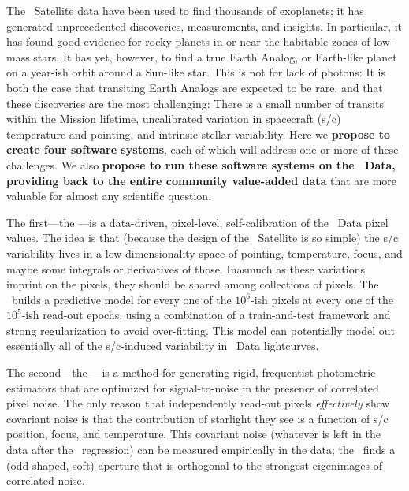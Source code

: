 \documentclass[letterpaper,12pt]{article}
\begin{document}
The \Kepler\ Satellite data have been used to find thousands of exoplanets;
it has generated unprecedented discoveries, measurements, and insights.
In particular, it has found good evidence for rocky planets in or near the
habitable zones of low-mass stars.
It has yet, however, to find a true Earth Analog, or Earth-like planet on a
year-ish orbit around a Sun-like star.
This is not for lack of photons:
It is both the case that transiting Earth Analogs are expected to be rare, and
that these discoveries are the most challenging:
There is a small number of transits within the Mission lifetime,
uncalibrated variation in spacecraft (s/c) temperature and pointing,
and intrinsic stellar variability.
Here we \textbf{propose to create four software systems}, each of which will
address one or more of these challenges.
We also \textbf{propose to run these software systems on the \Kepler\ Data,
providing back to the entire community value-added data} that are more valuable
for almost any scientific question.

The first---the \PLM---is a data-driven, pixel-level, self-calibration of the
\Kepler\ Data pixel values.  
The idea is that (because the design of the \Kepler\ Satellite is so simple)
the s/c variability lives in a low-dimensionality space of pointing,
temperature, focus, and maybe some integrals or derivatives of those.
Inasmuch as these variations imprint on the pixels, they should be shared among
collections of pixels.
The \PLM\ builds a predictive model for every one of the $10^6$-ish pixels at
every one of the $10^5$-ish read-out epochs, using a combination of a
train-and-test framework and strong regularization to avoid over-fitting.
This model can potentially model out essentially all of the s/c-induced
variability in \Kepler\ Data lightcurves.

The second---the \OWL---is a method for generating rigid, frequentist
photometric estimators that are optimized for signal-to-noise in the presence
of correlated pixel noise.
The only reason that independently read-out pixels \emph{effectively} show
covariant noise is that the contribution of starlight they see is a function
of s/c position, focus, and temperature.
This covariant noise (whatever is left in the data after the \PLM\ 
regression) can be measured empirically in the data; the \OWL\ finds a
(odd-shaped, soft) aperture that is orthogonal to the strongest eigenimages
of correlated noise.
\end{document}
